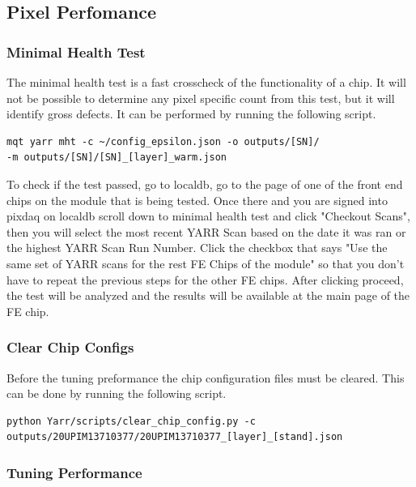 \documentclass[12pt]{article}
\begin{document}
\subsection{Pixel Perfomance}


\subsubsection{Minimal Health Test}

The minimal health test is a fast crosscheck of the functionality of a chip. It will not be possible to determine any pixel specific count from this test, but it will identify gross defects. It can be performed by running the following script. 

\begin{verbatim}
mqt yarr mht -c ~/config_epsilon.json -o outputs/[SN]/
-m outputs/[SN]/[SN]_[layer]_warm.json 
\end{verbatim}

To check if the test passed, go to localdb, go to the page of one of the front end chips on the module that is being tested. Once there and you are signed into pixdaq on localdb scroll down to minimal health test and click "Checkout Scans", then you will select the most recent YARR Scan based on the date it was ran or the highest YARR Scan Run Number. Click the checkbox that says "Use the same set of YARR scans for the rest FE Chips of the module" so that you don't have to repeat the previous steps for the other FE chips. After clicking proceed, the test will be analyzed and the results will be available at the main page of the FE chip. 

\subsubsection{Clear Chip Configs}

Before the tuning preformance the chip configuration files must be cleared. This can be done by running the following script. 

\begin{verbatim}
python Yarr/scripts/clear_chip_config.py -c outputs/20UPIM13710377/20UPIM13710377_[layer]_[stand].json
\end{verbatim}

\subsubsection{Tuning Performance}
\end{document}
